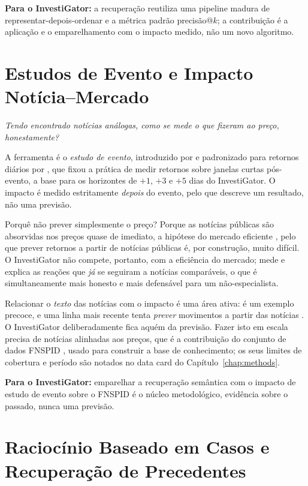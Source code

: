\textbf{Para o InvestiGator:} a recuperação reutiliza uma pipeline madura de representar-depois-ordenar e a
métrica padrão precisão@$k$; a contribuição é a aplicação e o emparelhamento com o impacto medido, não um
novo algoritmo.

\section{Estudos de Evento e Impacto Notícia--Mercado}
\label{sec:sota_eventstudy}

\emph{Tendo encontrado notícias análogas, como se mede o que fizeram ao preço, honestamente?}

A ferramenta é o \emph{estudo de evento}, introduzido por \textcite{fama1969adjustment} e padronizado para
retornos diários por \textcite{brown1985daily}, que fixou a prática de medir retornos sobre janelas curtas
pós-evento, a base para os horizontes de $+1$, $+3$ e $+5$ dias do InvestiGator. O impacto é medido
estritamente \emph{depois} do evento, pelo que descreve um resultado, não uma previsão.

Porquê não prever simplesmente o preço? Porque as notícias públicas são absorvidas nos preços quase de
imediato, a hipótese do mercado eficiente \autocite{fama1970efficient}, pelo que prever retornos a partir
de notícias públicas é, por construção, muito difícil. O InvestiGator não compete, portanto, com a
eficiência do mercado; mede e explica as reações que \emph{já} se seguiram a notícias comparáveis, o que é
simultaneamente mais honesto e mais defensável para um não-especialista.

Relacionar o \emph{texto} das notícias com o impacto é uma área ativa: \textcite{tetlock2007media} é um
exemplo precoce, e uma linha mais recente tenta \emph{prever} movimentos a partir das notícias
\autocite{xing2018nlffsurvey, ding2015deep}. O InvestiGator deliberadamente fica aquém da previsão. Fazer
isto em escala precisa de notícias alinhadas aos preços, que é a contribuição do conjunto de dados FNSPID
\autocite{dong2024fnspid}, usado para construir a base de conhecimento; os seus limites de cobertura e
período são notados no data card do Capítulo~\ref{chap:methods}.

\textbf{Para o InvestiGator:} emparelhar a recuperação semântica com o impacto de estudo de evento sobre o
FNSPID é o núcleo metodológico, evidência sobre o passado, nunca uma previsão.

\section{Raciocínio Baseado em Casos e Recuperação de Precedentes}
\label{sec:sota_cbr}


